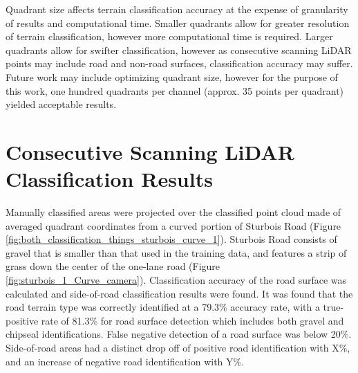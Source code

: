 \documentclass[numbered,pdftex]{ohio-etd}
\begin{document}
{		{Quadrant size affects terrain classification accuracy at the expense of granularity of results and computational time. Smaller quadrants allow for greater resolution of terrain classification, however more computational time is required. Larger quadrants allow for swifter classification, however as consecutive scanning LiDAR points may include road and non-road surfaces, classification accuracy may suffer. Future work may include optimizing quadrant size, however for the purpose of this work, one hundred quadrants per channel (approx. 35 points per quadrant) yielded acceptable results.}
	
	\section{Consecutive Scanning LiDAR Classification Results}
	
		{Manually classified areas were projected over the classified point cloud made of averaged quadrant coordinates from a curved portion of Sturbois Road (Figure \ref{fig:both_classification_things_sturbois_curve_1}). Sturbois Road consists of gravel that is smaller than that used in the training data, and features a strip of grass down the center of the one-lane road (Figure \ref{fig:sturbois_1_Curve_camera}). Classification accuracy of the road surface was calculated and side-of-road classification results were found. It was found that the road terrain type was correctly identified at a 79.3\% accuracy rate, with a true-positive rate of 81.3\% for road surface detection which includes both gravel and chipseal identifications. False negative detection of a road surface was below 20\%. Side-of-road areas had a distinct drop off of positive road identification with X\%, and an increase of negative road identification with Y\%.} 
		
}
\end{document}
